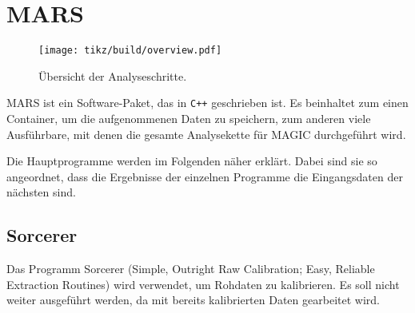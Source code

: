\section{MARS}%
\label{sec:mars}

\begin{wrapfigure}[35]{r}{0.5\textwidth}
  \centering
  \texttt{[image: tikz/build/overview.pdf]}
  \caption{Übersicht der Analyseschritte.}%
  \label{fig:uebersicht}
\end{wrapfigure}

MARS ist ein Software-Paket, das in \texttt{C++} geschrieben ist.
Es beinhaltet zum einen Container, um die aufgenommenen Daten zu speichern,
zum anderen viele Ausführbare,
mit denen die gesamte Analysekette für MAGIC durchgeführt wird.

Die Hauptprogramme werden im Folgenden näher erklärt.
Dabei sind sie so angeordnet, dass die Ergebnisse der einzelnen
Programme die Eingangsdaten der nächsten sind.

\subsection{Sorcerer}%
\label{sub:sorcerer}

Das Programm Sorcerer (Simple, Outright Raw Calibration; Easy, Reliable
Extraction Routines) wird verwendet, um Rohdaten zu kalibrieren.
Es soll nicht weiter ausgeführt werden, da mit bereits kalibrierten Daten
gearbeitet wird.










